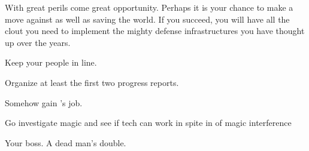 \documentclass[char]{guildcamp3}
\begin{document}
With great perils come great opportunity. Perhaps it is your chance to make a move against \cPoliOne{} as well as saving the world. If you succeed, you will have all the clout you need to implement the mighty defense infrastructures you have thought up over the years.








\begin{itemz}[Goals]
  \item Keep your people in line.
  \item Organize at least the first two progress reports.
  \item Somehow gain \cPoliOne{}'s job.
  \item Go investigate magic and see if tech can work in spite in of magic interference
\end{itemz}



\begin{contacts}
  \contact{\cPoliOne{}} Your boss.
  \contact{\cRogueOne{}} A dead man's double.
\end{contacts}
\end{document}
